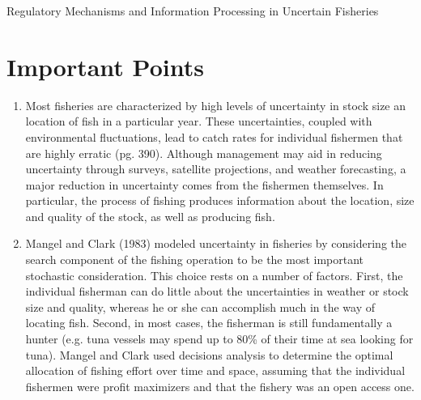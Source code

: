 \documentclass[a4paper,11pt]{article}
\begin{document}
\begin{center}
{\Large Regulatory Mechanisms and Information Processing in Uncertain Fisheries}

\cite{@MangelPlant:1985}
\end{center}


\section*{Important Points}
\begin{enumerate}
\item Most fisheries are characterized by high levels of uncertainty in stock size an location of fish in a particular year. These uncertainties, coupled with environmental fluctuations, lead to catch rates for individual fishermen that are highly erratic (pg. 390).  Although management may aid in reducing uncertainty through surveys, satellite projections, and weather forecasting, a major reduction in uncertainty comes from the fishermen themselves. In particular, the process of fishing produces information about the location, size and quality of the stock, as well as producing fish.
\item Mangel and Clark (1983)  modeled uncertainty in fisheries by considering the search component of the fishing operation to be the most important stochastic consideration. This choice rests on a number of factors. First, the individual fisherman can do little about the uncertainties in weather or stock size and quality, whereas he or she can accomplish much in the way of locating fish. Second, in most cases, the fisherman is still fundamentally a hunter (e.g. tuna vessels may spend up to 80\% of their time at sea looking for tuna). Mangel and Clark used decisions analysis to determine the optimal allocation of fishing effort over time and space, assuming that the individual fishermen were profit maximizers and that the fishery was an open access one. 

\end{enumerate}
\end{document}
